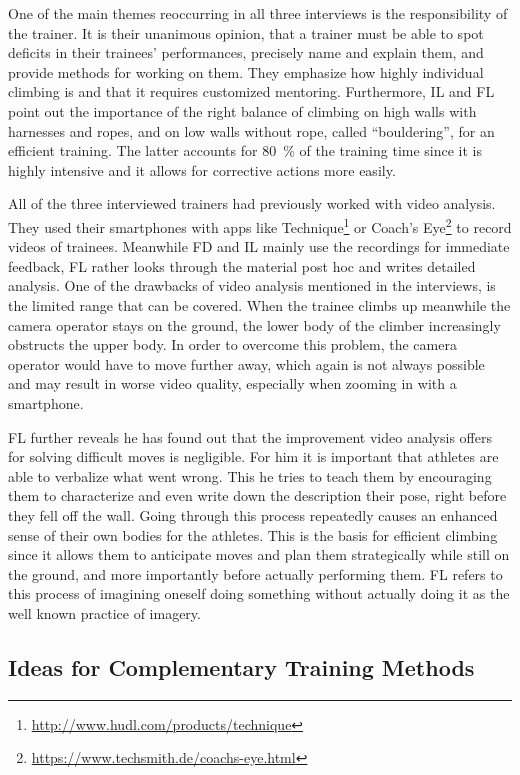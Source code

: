 One of the main themes reoccurring in all three interviews is the responsibility of the trainer. It is their unanimous opinion, that a trainer must be able to spot deficits in their trainees' performances, precisely name and explain them, and provide methods for working on them. They emphasize how highly individual climbing is and that it requires customized mentoring. Furthermore, IL and FL point out the importance of the right balance of climbing on high walls with harnesses and ropes, and on low walls without rope, called \enquote{bouldering}, for an efficient training. The latter accounts for \SI{80}{\percent} of the training time since it is highly intensive and it allows for corrective actions more easily.

All of the three interviewed trainers had previously worked with video analysis. They used their smartphones with apps like Technique\footnote{\url{http://www.hudl.com/products/technique}} or Coach's Eye\footnote{\url{https://www.techsmith.de/coachs-eye.html}} to record videos of trainees. Meanwhile FD and IL mainly use the recordings for immediate feedback, FL rather looks through the material post hoc and writes detailed analysis. One of the drawbacks of video analysis mentioned in the interviews, is the limited range that can be covered. When the trainee climbs up meanwhile the camera operator stays on the ground, the lower body of the climber increasingly obstructs the upper body. In order to overcome this problem, the camera operator would have to move further away, which again is not always possible and may result in worse video quality, especially when zooming in with a smartphone.

FL further reveals he has found out that the improvement video analysis offers for solving difficult moves is negligible. For him it is important that athletes are able to verbalize what went wrong. This he tries to teach them by encouraging them to characterize and even write down the description their pose, \eg right before they fell off the wall. Going through this process repeatedly causes an enhanced sense of their own bodies for the athletes. This is the basis for efficient climbing since it allows them to anticipate moves and plan them strategically while still on the ground, and more importantly before actually performing them. FL refers to this process of imagining oneself doing something without actually doing it as the well known practice of imagery.

\subsection{Ideas for Complementary Training Methods}
\label{sec:ideas}

